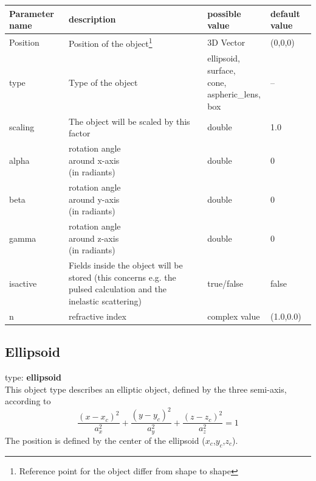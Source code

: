 \documentclass[a4paper,html,11pt,openany]{book}
\begin{document}
 \vspace{1em}
 \begin{longtable}{p{2cm}|m{3.5cm}|m{3.0cm}|p{1.7cm}}
 Parameter name & description  & possible value & default value\\
 \hline
  Position & Position of the object\footnote{Reference point for the object differ from shape to shape} & 3D Vector & (0,0,0) \\
  \hline
  type & Type of the object  & \parbox{3cm}{ellipsoid,\\surface,\\cone,\\aspheric\_lens,\\box} & --  \\
  \hline   
  scaling & The object will be scaled by this factor & double & 1.0 \\
  \hline
  alpha & \parbox{3.5cm}{rotation angle\\around x-axis\\(in radiants)} & double & 0 \\ 
    \hline
  beta & \parbox{3.5cm}{rotation angle\\around y-axis\\(in radiants)} & double & 0 \\ 
      \hline
  gamma & \parbox{3.5cm}{rotation angle\\around z-axis\\(in radiants)} & double & 0 \\ 
  \hline
  isactive & \parbox{3.5cm}{Fields inside the object will be stored (this concerns e.g. the pulsed calculation and the inelastic scattering)} & true/false & false \\
  \hline
  n & refractive index & complex value & (1.0,0.0) 
\end{longtable} 
  
\subsection{Ellipsoid}
 type: \textbf {ellipsoid} \\
 This object type describes an elliptic object, defined by the three semi-axis, according to
  \begin{equation}
  \frac{(x-x_c)^2}{a_x^2}+\frac{(y-y_c)^2}{a_y^2}+\frac{(z-z_c)^2}{a_z^2}=1
\end{equation}   
The position is defined by the center of the ellipsoid ($x_c$,$y_c$,$z_c$).
\end{document}
